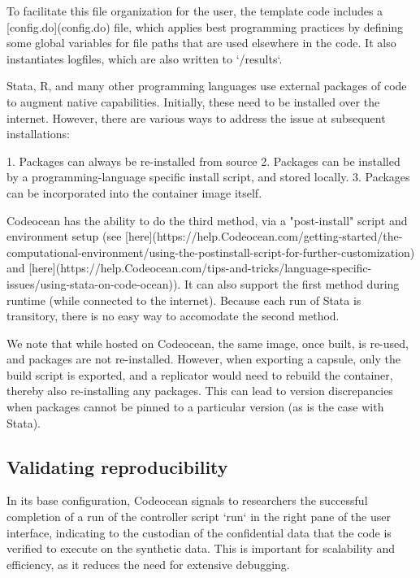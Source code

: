 \documentclass[]{hdsr}
\begin{document}
To facilitate this file organization for the user, the template code includes a [config.do](config.do) file, which applies best programming practices by defining some global variables for file paths that are used elsewhere in the code. It also instantiates logfiles, which are also written to `/results`.



Stata, R, and many other programming languages use external packages of code to augment native capabilities. Initially, these need to be installed over the internet. However, there are various ways to address the issue at subsequent installations:

1. Packages can always be re-installed from source
2. Packages can be installed by a programming-language specific install script, and stored locally. 
3. Packages can be incorporated into the container image itself.

Codeocean has the ability to do the third method, via a "post-install" script and environment setup (see [here](https://help.Codeocean.com/getting-started/the-computational-environment/using-the-postinstall-script-for-further-customization) and [here](https://help.Codeocean.com/tips-and-tricks/language-specific-issues/using-stata-on-code-ocean)). It can also support the first method during runtime (while connected to the internet). Because each run of Stata is transitory, there is no easy way to accomodate the second method. 

We note that while hosted on Codeocean, the same image, once built, is re-used, and packages are not re-installed. However, when exporting a capsule, only the build script is exported, and a replicator would need to rebuild the container, thereby also re-installing any packages. This can lead to version discrepancies when packages cannot be pinned to a particular version (as is the case with Stata). 

\subsection{Validating reproducibility}

In its base configuration, Codeocean signals to researchers the successful completion of a run of the controller script `run` in the right pane of the user interface, indicating to the custodian of the confidential data that the code is verified to execute on the synthetic data. This is important for scalability and efficiency, as it reduces the need for extensive debugging.
\end{document}
